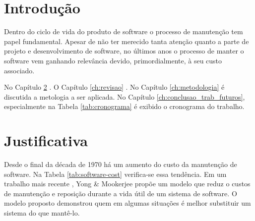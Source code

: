 \documentclass[msc,proposal,hidelot,hideabstract]{ppgccufmg} %
\begin{document}
\chapter{Introdução}
\label{ch:intro}
Dentro do ciclo de vida do produto de software o processo de manutenção tem
papel fundamental. Apesar de não ter merecido tanta atenção quanto a parte de
projeto e desenvolvimento de software, no últimos anos o processo de manter o
software vem ganhando relevância devido, primordialmente, à seu custo
associado.

No Capítulo \ref{ch:justificativa} . O Capítulo \ref{ch:revisao} . No
Capítulo \ref{ch:metodologia} é discutida a metologia a ser aplicada. No
Capítulo \ref{ch:conclusao_trab_futuros}, especialmente na Tabela \ref{tab:cronograma} é exibido o cronograma do trabalho.

\chapter{Justificativa}
\label{ch:justificativa}
Desde o final da década de 1970 há um aumento do custo da manutenção de software. Na
Tabela \ref{tab:software-cost} verifica-se essa tendência. Em um trabalho mais
recente \cite{1423995}, Yong \& Mookerjee propõe um modelo que reduz o custos de
manutenção e reposição durante a vida útil de um sistema de software. O modelo
proposto demonstrou quem em algumas situações é melhor substituir um sistema
do que mantê-lo.
\end{document}

